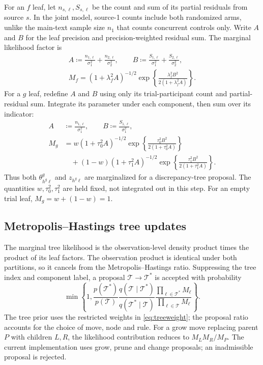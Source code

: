 For an $f$ leaf, let $n_{s,\ell},S_{s,\ell}$ be the count and sum of its partial residuals from source $s$. In the joint model, source-1 counts include both randomized arms, unlike the main-text sample size $n_1$ that counts concurrent controls only. Write $A$ and $B$ for the leaf precision and precision-weighted residual sum. The marginal likelihood factor is
\begin{equation}\label{eq:Mf}
\begin{gathered}
A\coloneqq \frac{n_{1,\ell}}{\sigma_1^2}+\frac{n_{2,\ell}}{\sigma_2^2},\qquad
B\coloneqq \frac{S_{1,\ell}}{\sigma_{1}^2}+\frac{S_{2,\ell}}{\sigma_{2}^2},\\
M_f=(1+\lambda_f^2A)^{-1/2}
\exp\!\left\{\frac{\lambda_f^2B^2}{2(1+\lambda_f^2A)}\right\}.
\end{gathered}
\end{equation}
For a $g$ leaf, redefine $A$ and $B$ using only its trial-participant count and partial-residual sum. Integrate its parameter under each component, then sum over its indicator:
\begin{equation}\label{eq:Mg}
\begin{aligned}
A&\coloneqq \frac{n_{1,\ell}}{\sigma_1^2},\qquad B\coloneqq \frac{S_{1,\ell}}{\sigma_1^2},\\
M_g&=w(1+\tau_0^2A)^{-1/2}
\exp\!\left\{\frac{\tau_0^2B^2}{2(1+\tau_0^2A)}\right\}\\
&\quad+(1-w)(1+\tau_1^2A)^{-1/2}
\exp\!\left\{\frac{\tau_1^2B^2}{2(1+\tau_1^2A)}\right\}.
\end{aligned}
\end{equation}
Thus both $\theta^g_{h^g\ell}$ and $z_{h^g\ell}$ are marginalized for a discrepancy-tree proposal. The quantities $w,\tau_0^2,\tau_1^2$ are held fixed, not integrated out in this step. For an empty trial leaf, $M_g=w+(1-w)=1$.

\subsection{Metropolis--Hastings tree updates}\label{sec:A.4}
The marginal tree likelihood is the observation-level density product times the product of its leaf factors. The observation product is identical under both partitions, so it cancels from the Metropolis--Hastings ratio. Suppressing the tree index and component label, a proposal $\mathcal T\to \mathcal T^*$ is accepted with probability
\begin{equation}\label{eq:MH}
\min\left\{1,
\frac{p(\mathcal T^*)}{p(\mathcal T)}\frac{q(\mathcal T\mid \mathcal T^*)}{q(\mathcal T^*\mid \mathcal T)}
\frac{\prod_{\ell\in \mathcal T^*}M_\ell}{\prod_{\ell\in \mathcal T}M_\ell}\right\}.
\end{equation}
The tree prior uses the restricted weights in \eqref{eq:treeweight}; the proposal ratio accounts for the choice of move, node and rule. For a grow move replacing parent $P$ with children $L,R$, the likelihood contribution reduces to $M_LM_R/M_P$. The current implementation uses grow, prune and change proposals; an inadmissible proposal is rejected.

